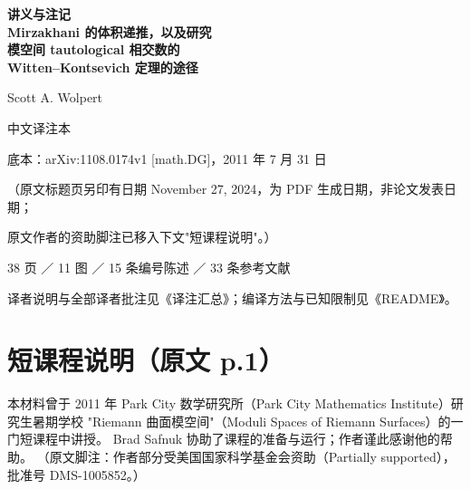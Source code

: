 
\begin{titlepage}
\centering
\vspace*{2.2cm}

{\Large\bfseries 讲义与注记\\[0.4em]
Mirzakhani 的体积递推，以及研究\\[0.1em]
模空间 tautological 相交数的\\[0.1em]
Witten--Kontsevich 定理的途径\par}

\vspace{1.6cm}
{\large Scott A. Wolpert\par}

\vspace{2.2cm}
{\normalsize 中文译注本\par}
\vspace{0.3cm}
{\small 底本：arXiv:1108.0174v1 [math.DG]，2011 年 7 月 31 日\par}
{\small （原文标题页另印有日期 November 27, 2024，为 PDF 生成日期，非论文发表日期；\par}
{\small 原文作者的资助脚注已移入下文"短课程说明"。）\par}
{\small 38 页 ／ 11 图 ／ 15 条编号陈述 ／ 33 条参考文献\par}

\vfill
{\small 译者说明与全部译者批注见《译注汇总》；编译方法与已知限制见《README》。\par}
\end{titlepage}

\section*{短课程说明（原文 p.1）}

本材料曾于 2011 年 Park City 数学研究所（Park City Mathematics Institute）研究生暑期学校
"Riemann 曲面模空间"（Moduli Spaces of Riemann Surfaces）的一门短课程中讲授。
Brad Safnuk 协助了课程的准备与运行；作者谨此感谢他的帮助。
（原文脚注：作者部分受美国国家科学基金会资助（Partially supported），批准号 DMS-1005852。）

